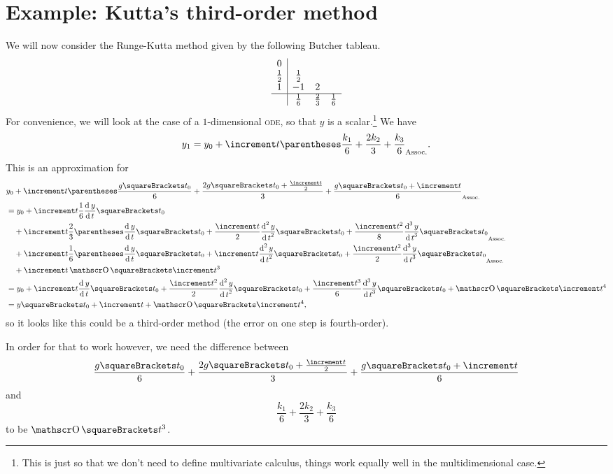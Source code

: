 \documentclass[10pt, a4paper, twoside]{basestyle}
\begin{document}
\section{Example: Kutta's third-order method}
We will now consider the Runge-Kutta method given by the following Butcher tableau.\[
\begin{array}{c | c c c}
0           &                  \\
\frac 1 2   & \frac 1 2    &   \\
1           & -1           & 2 \\
\hline
            &  \frac 1 6   & \frac 2 3 & \frac 1 6
\end{array}
\]
For convenience, we will look at the case of a $1$-dimensional \textsc{ode}, so that $y$ is a scalar.\footnote{This is just so that we don't need to define multivariate calculus, things work equally well in the multidimensional case.}
We have \[
y_1 = y_0 + \increment t \pa{\frac{k_1}{6} + \frac{2k_2}{3} + \frac{k_3}{6}}\text.
\]
This is an approximation for
\begin{align*}
& y_0 + \increment t \pa{\frac{g\of{t_0}}{6} 
          + \frac{2g\of{t_0 + \frac{\increment t}{2}}}{3} + \frac{g\of{t_0 + \increment t}}{6}}\\
&= y_0 + \increment t \frac{1}{6}\deriv t y \of{t_0} \\
 & \quad + \increment t \frac{2}{3}\pa{\deriv t y \of{t_0} + \frac{\increment t}{2} \deriv[2] t y \of{t_0} + \frac{\increment t^2}{8} \deriv[3] t y \of{t_0}} \\
 & \quad + \increment t \frac{1}{6}\pa{\deriv t y \of{t_0} + \increment t \deriv[2] t y \of{t_0} + \frac{\increment t^2}{2} \deriv[3] t y \of{t_0}} \\
 &\quad  + \increment t \BigO\of{\increment t^3} \\
&= y_0 + \increment t \deriv t y \of{t_0} + \frac{\increment t^2}{2} \deriv[2] t y \of{t_0} + \frac{\increment t^3}{6} \deriv[3] t y \of{t_0} + \BigO\of{\increment t^4} \\
&= y\of{t_0 + \increment t} + \BigO\of{\increment t^4}\text,
\end{align*}
so it looks like this could be a third-order method (the error on one step is fourth-order).

In order for that to work however, we need the difference between \[
\frac{g\of{t_0}}{6} + \frac{2g\of{t_0 + \frac{\increment t}{2}}}{3} + \frac{g\of{t_0 + \increment t}}{6}
\]and\[
\frac{k_1}{6} + \frac{2k_2}{3} + \frac{k_3}{6}
\]to be $\BigO\of{t^3}$.
\end{document}
